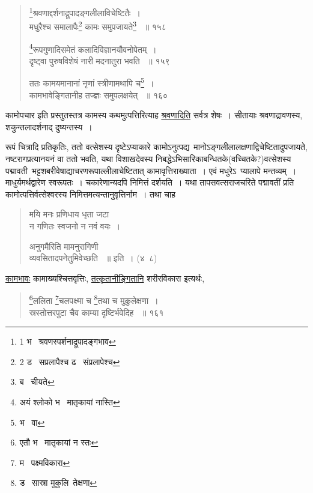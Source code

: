 \documentclass[11pt, openany]{book}
\begin{document}
{\begin{quote}
 {\na \renewcommand{\thefootnote}{1}\footnote{1 भ \textendash\ श्रवणस्पर्शनाद्रूपादङ्गभाव}श्रवणाद्दर्शनाद्रूपादङ्गलीलाविचेष्टितैः~। \\
मधुरैश्च समालापैः\renewcommand{\thefootnote}{2}\footnote{ 2 ड \textendash\ सप्रलापैश्च ढ \textendash\ संप्रलापेश्च } कामः समुपजायते\renewcommand{\thefootnote}{3}\footnote{ब \textendash\ चीयते } ~॥ १५८ 

\renewcommand{\thefootnote}{4}\footnote{अयं श्लोको भ \textendash\ मातृकायां नास्ति}रूपगुणादिसमेतं कलादिविज्ञानयौवनोपेतम्~।\\ 
दृष्ट्वा पुरुषविशेषं नारी मदनातुरा भवति ~॥ १५९ 

ततः कामयमानानां नृणां स्त्रीणामथापि च\renewcommand{\thefootnote}{5}\footnote{भ \textendash\ वा }~।\\ 
कामभावेङ्गितानीह तज्ज्ञः समुपलक्षयेत् ~॥ १६०}
\end{quote}

कामोपचार इति प्रस्तुतस्तत्र कामस्य कथमुत्पत्तिरित्याह \underline{श्रवणादिति} सर्वत्र शेषः~। सीतायाः श्रवणाद्रावणस्य, शकुन्तलादर्शनाद् दुष्यन्तस्य~।\\ 

\begin{sloppypar}
रूपं चित्रादि प्रतिकृतिः, ततो वत्सेशस्य दृष्टेऽप्याकारे कामोऽनुत्पद्य\textendash\ मानोऽङ्गलीलालक्षणाद्विचेष्टितादुपजायते, नष्टरागप्रत्यानयनं वा ततो भवति, यथा विशाखदेवस्य निबद्धेऽभिसारिकाबन्धितके(वच्चितके?)वत्सेशस्य पद्मावती\textendash\ भट्टशबरीवेषाद्याचरणरूपाल्लीलाचेष्टितात् कामावृत्तिराख्याता~। एवं मधुरेऽ\textendash\ प्यालापे मन्तव्यम्~। माधुर्यमर्थद्वारेण स्वरूपतः~। चकारेणान्यदपि निमित्तं दर्शयति~। यथा तापसवत्सराजचरिते पद्मावतीं प्रति कामोत्पत्तिर्वत्सेश्वरस्य निमित्तमत्यन्तानुवृत्तिर्नाम~। तथा चाह\textendash\ 
\end{sloppypar}

\begin{quote}
 {\qt मयि मनः प्रणिधाय धृता जटा \\
न गणितः स्वजनो न नवं वयः~। 

अनुगमैरिति मामनुरागिणी\\ 
व्यवसितादपनेतुमिवेच्छति ~॥ इति~। (४\textendash\ ८) }
\end{quote}

\noindent
\underline{कामभावः} कामाख्यश्चित्तवृत्तिः, \underline{तत्कृतानीङ्गितानि} शरीरविकारा इत्यर्थः,

\newpage

\begin{quote}
 {\na \renewcommand{\thefootnote}{1}\footnote{एतौ भ \textendash\ मातृकायां न स्तः}ललिता \renewcommand{\thefootnote}{2}\footnote{म \textendash\ पक्ष्मविकारा}चलपक्ष्मा च \renewcommand{\thefootnote}{3}\footnote{ड \textendash\ सास्रा मुकुलि\textendash\ तेक्षणा}तथा च मुकुलेक्षणा~। \\
स्रस्तोत्तरपुटा चैव काम्या दृष्टिर्भवेदिह ~॥ १६१ 

}
\end{quote}}
\end{document}
